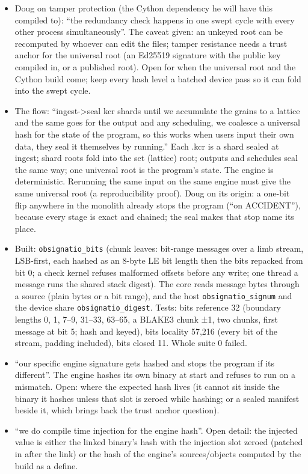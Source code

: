\begin{itemize}
\item Doug on tamper protection (the Cython dependency he will have this compiled to): “the redundancy check happens in one swept cycle with every other process simultaneously”. The caveat given: an unkeyed root can be recomputed by whoever can edit the files; tamper resistance needs a trust anchor for the universal root (an Ed25519 signature with the public key compiled in, or a published root). Open for when the universal root and the Cython build come; keep every hash level a batched device pass so it can fold into the swept cycle.
\item The flow: “ingest->seal kcr shards until we accumulate the grains to a lattice and the same goes for the output and any scheduling, we coalesce a universal hash for the state of the program, so this works when users input their own data, they seal it themselves by running.” Each .kcr is a shard sealed at ingest; shard roots fold into the set (lattice) root; outputs and schedules seal the same way; one universal root is the program's state. The engine is deterministic. Rerunning the same input on the same engine must give the same universal root (a reproducibility proof). Doug on its origin: a one-bit flip anywhere in the monolith already stops the program (“on ACCIDENT”), because every stage is exact and chained; the seal makes that stop name its place.
\item Built: \texttt{obsignatio\_\allowbreak{}bits} (chunk leaves: bit-range messages over a limb stream, LSB-first, each hashed as an 8-byte LE bit length then the bits repacked from bit 0; a check kernel refuses malformed offsets before any write; one thread a message runs the shared stack digest). The core reads message bytes through a source (plain bytes or a bit range), and the host \texttt{obsignatio\_\allowbreak{}signum} and the device share \texttt{obsignatio\_\allowbreak{}digest}. Tests: bits reference 32 (boundary lengths 0, 1, 7–9, 31–33, 63–65, a BLAKE3 chunk ±1, two chunks, first message at bit 5; hash and keyed), bits locality 57,216 (every bit of the stream, padding included), bits closed 11. Whole suite 0 failed.
\item “our specific engine signature gets hashed and stops the program if its different”. The engine hashes its own binary at start and refuses to run on a mismatch. Open: where the expected hash lives (it cannot sit inside the binary it hashes unless that slot is zeroed while hashing; or a sealed manifest beside it, which brings back the trust anchor question).
\item “we do compile time injection for the engine hash”. Open detail: the injected value is either the linked binary's hash with the injection slot zeroed (patched in after the link) or the hash of the engine's sources/objects computed by the build as a define.

\end{itemize}
